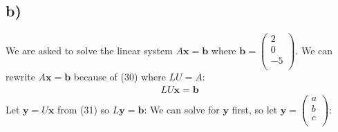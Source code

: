 \documentclass[11pt]{article}
\begin{document}
\subsection{b)}
We are asked to solve the linear system $A\textbf{x} =\textbf{b}$
where $\textbf{b} = 
\left(\begin{array}{c}
2\\
0\\
-5\\
\end{array}\right)$.
We can rewrite $A\textbf{x} =\textbf{b}$ because of (30) where $LU=A$:
\begin{align}
LU\textbf{x} =\textbf{b}
\end{align}
Let $\textbf{y}=U\textbf{x}$ from (31) so $L\textbf{y}=\textbf{b}$:
We can solve for $\textbf{y}$ first, so let $\textbf{y} = 
\left(\begin{array}{c}
a\\
b\\
c\\
\end{array}\right)$:
\end{document}
